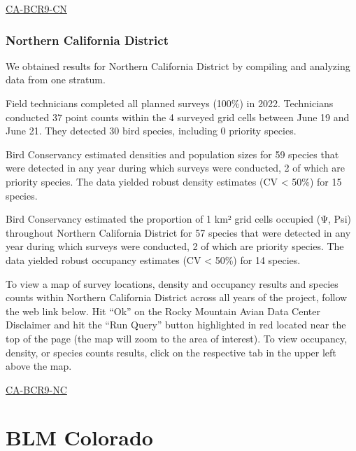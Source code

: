 \documentclass[
  letterpaper,
  DIV=11,
  numbers=noendperiod,
  oneside]{scrreprt}
\begin{document}
\href{http://www.rmbo.org/new_site/adc/QueryWindow.aspx\#N4IgzgLgTghhCuBbEAuABCAwgQQLQCFMAlATl0wDl194oBTGeNAewDM0AZGAOwBM0AsjxgBzOojrcIaXGkyToMADZzlAS1bMo3NTDQARNZChqAxhBABfIA==}{CA-BCR9-CN}

\hypertarget{northern-california-district}{%
\subsubsection{Northern California
District}\label{northern-california-district}}

We obtained results for Northern California District by compiling and
analyzing data from one stratum.

Field technicians completed all planned surveys (100\%) in 2022.
Technicians conducted 37 point counts within the 4 surveyed grid cells
between June 19 and June 21. They detected 30 bird species, including 0
priority species.

Bird Conservancy estimated densities and population sizes for 59 species
that were detected in any year during which surveys were conducted, 2 of
which are priority species. The data yielded robust density estimates
(CV \textless{} 50\%) for 15 species.

Bird Conservancy estimated the proportion of 1 km² grid cells occupied
(Ψ, Psi) throughout Northern California District for 57 species that
were detected in any year during which surveys were conducted, 2 of
which are priority species. The data yielded robust occupancy estimates
(CV \textless{} 50\%) for 14 species.

To view a map of survey locations, density and occupancy results and
species counts within Northern California District across all years of
the project, follow the web link below. Hit ``Ok'' on the Rocky Mountain
Avian Data Center Disclaimer and hit the ``Run Query'' button
highlighted in red located near the top of the page (the map will zoom
to the area of interest). To view occupancy, density, or species counts
results, click on the respective tab in the upper left above the map.

\href{http://www.rmbo.org/new_site/adc/QueryWindow.aspx\#N4IgzgLgTghhCuBbEAuABCAwgQQLQCFMAlATlwDlN194oBTGeNAewDM0AZGAOwBM0AsjxgBzOojrcIaXGnLMoEABZ0o3NJhgAbAJasF3HTDQARHZCg6AxhBABfIA}{CA-BCR9-NC}

\hypertarget{blm-colorado}{%
\section{BLM Colorado}\label{blm-colorado}}
\end{document}
